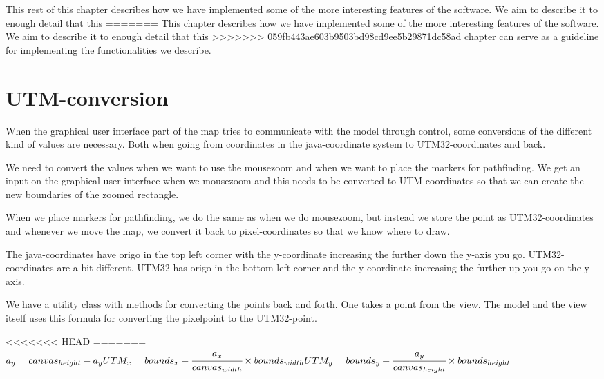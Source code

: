 This rest of this chapter describes how we have implemented some of the more
interesting features of the software. We aim to describe it to enough detail that this
=======
This chapter describes how we have implemented some of the more interesting
features of the software. We aim to describe it to enough detail that this
>>>>>>> 059fb443ae603b9503bd98cd9ee5b29871dc58ad
chapter can serve as a guideline for implementing the functionalities we
describe.

\section{UTM-conversion}
\label{IMPL-UTM}
When the graphical user interface part of the map tries to communicate with the
model through control, some conversions of the different kind of values are
necessary. Both when going from coordinates in the java-coordinate system to
UTM32-coordinates and back. 

We need to convert the values when we want to use the mousezoom and when we want
to place the markers for pathfinding. We get an input on the graphical user
interface when we mousezoom and this needs to be converted to UTM-coordinates so
that we can create the new boundaries of the zoomed rectangle.

When we place markers for pathfinding, we do the same as when we do mousezoom,
but instead we store the point as UTM32-coordinates and whenever we move the
map, we convert it back to pixel-coordinates so that we know where to draw.

The java-coordinates have origo in the top left corner with the y-coordinate
increasing the further down the y-axis you go. UTM32-coordinates are a bit
different. UTM32 has origo in the bottom left corner and the y-coordinate
increasing the further up you go on the y-axis.

We have a utility class with methods for converting the points back and forth.
One takes a point from the view. The model and the view itself uses this formula
for converting the pixelpoint to the UTM32-point.

<<<<<<< HEAD
=======
$
a_y = canvas_{height} - a_y\\
\\
UTM_x = bounds_x + \cfrac{a_x}{canvas_{width}} \times bounds_{width}\\
\\
UTM_y = bounds_y + \cfrac{a_y}{canvas_{height}} \times
bounds_{height}\\
\\
$

